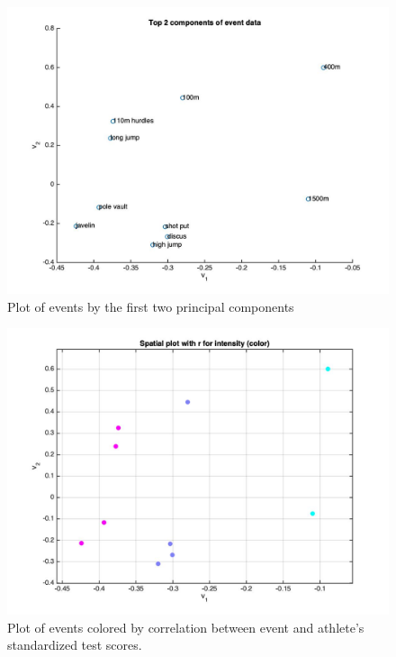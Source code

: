 \documentclass[12pt]{exam}
\begin{document}
\begin{questions}
  \begin{figure}[hpb!]
    \centering
    \includegraphics[scale=0.3]{data/principal_components.jpg}
    \caption{Plot of events by the first two principal components}
    \label{fig:principal_components}
  \end{figure}

   \begin{figure}[hpb!]
    \centering
    \includegraphics[scale=0.3]{data/intensity_plot.jpg}
    \caption{Plot of events colored by correlation between event and athlete's standardized test scores.}
    \label{fig:intensity_plot}
  \end{figure}


\end{questions}
\end{document}
